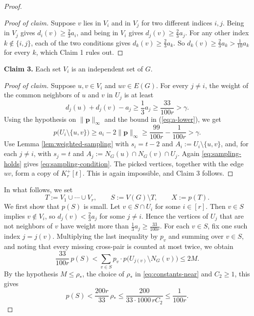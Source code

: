 \documentclass[11pt, a4paper]{article}
\theoremstyle{definition}
\theoremstyle{plain}
\renewcommand{\le}{\leqslant}
\renewcommand{\ge}{\geqslant}
\newcommand{\pmax}{\lVert \bm{p} \rVert_{\infty}}
\begin{document}
\begin{proof}
\begin{proof}[Proof of claim]
Suppose $v$ lies in $V_i$ and in $V_j$ for two
different indices $i,j$. Being in $V_j$ gives
$d_i(v)\ge \frac23a_i$, and being in $V_i$ gives
$d_j(v)\ge \frac23a_j$. For any other index $k\notin \{i,j\}$,
each of the two conditions gives
$d_k(v)\ge \frac23a_k$. So
$d_k(v)\ge \frac23a_k>\frac{1}{10}a_k$ for every
$k$, which Claim 1 rules out.
\end{proof}

\medskip
\noindent\textbf{Claim 3.}
Each set $V_i$ is an independent set of $G$.

\begin{proof}[Proof of claim]
Suppose $u,v\in V_i$ and $uv\in E(G)$. For every
$j\ne i$, the weight of the common neighbors of
$u$ and $v$ in $U_j$ is at least
\[
  d_j(u)+d_j(v)-a_j
  \ge \frac13a_j
  \ge \frac{33}{100r}
  >\gamma .
\]
Using the hypothesis on $\pmax$ and the bound in (\ref{eq:a-lower}), we get  
\[
  p\bigl(U_i\setminus\{u,v\}\bigr)
  \ge a_i-2\pmax
  \ge \frac{99}{100r}-\frac{1}{100r} 
  >\gamma .
\]
Use Lemma \ref{lem:weighted-sampling} with
$s_i=t-2$ and $A_i:=U_i\setminus\{u,v\}$, and,
for each $j\ne i$, with $s_j=t$ and
$A_j:=N_G(u)\cap N_G(v)\cap U_j$. Again
\eqref{eq:sampling-holds} gives
\eqref{eq:sampling-condition}. The picked
vertices, together with the edge $uv$, form a copy
of $K_r^+[t]$. This is again impossible, and Claim 3
follows. 
\end{proof}

In what follows, we set   
\[
  T:=V_1\cup\cdots\cup V_r,
  \qquad
  S:=V(G)\setminus T,
  \qquad
  X:=p(T).
\]
We first show that $p(S)$ is small. Let
$v\in S\cap U_i$ for some $i\in [r]$. Then $v\in S$ implies $v\notin V_i$, so
$d_j(v)<\frac23a_j$ for some $j\ne i$. Hence the
vertices of $U_j$ that are not neighbors of $v$
have weight more than
$\frac13a_j\ge \frac{33}{100r}$. 
For each $v\in S$, fix one such index $j=j(v)$.
Multiplying the last inequality by $p_v$ and summing  over $v\in S$, and noting that every missing cross-pair is counted at most twice, we obtain  
\[
  \frac{33}{100r}\,p(S) 
  <\sum_{v\in S}p_v\cdot 
    p\bigl(U_{j(v)}\setminus N_G(v)\bigr)
  \le 2M .
\]
By the hypothesis $M\le \rho_*$, the choice of
$\rho_*$ in \eqref{eq:constants-near} and
$C_2\ge 1$, this gives 
\begin{equation}\label{eq:s-small}
  p(S) <\frac{200r}{33}\,\rho_*
  \le \frac{200}{33\cdot 1000\,rC_2}
  \le \frac{1}{100r}.
\end{equation}


\end{proof}
\end{document}
